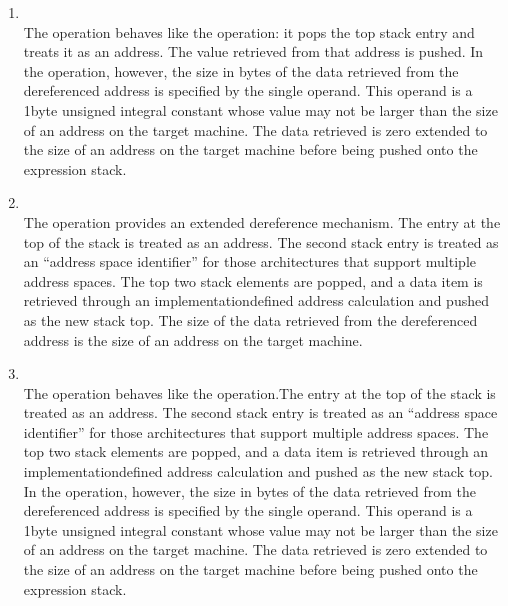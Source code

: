 \begin{enumerate}[1]
\item {} \\
The  operation behaves like the 
operation: it pops the top stack entry and treats it as an
address. The value retrieved from that address is pushed. In
the  operation, however, the size in bytes
of the data retrieved from the dereferenced address is
specified by the single operand. This operand is a 1\dash byte
unsigned integral constant whose value may not be larger
than the size of an address on the target machine. The data
retrieved is zero extended to the size of an address on the
target machine before being pushed onto the expression stack.

\item {} \\
The  operation provides an extended dereference
mechanism. The entry at the top of the stack is treated as an
address. The second stack entry is treated as an “address
space identifier” for those architectures that support
multiple address spaces. The top two stack elements are popped,
and a data item is retrieved through an implementation\dash defined
address calculation and pushed as the new stack top. The size
of the data retrieved from the dereferenced address is the
size of an address on the target machine.

\item {}\\
The  operation behaves like the
 operation.The entry at the top of the stack is
treated as an address. The second stack entry is treated as
an “address space identifier” for those architectures
that support multiple address spaces. The top two stack
elements are popped, and a data item is retrieved through an
implementation\dash defined address calculation and pushed as the
new stack top. In the  operation, however,
the size in bytes of the data retrieved from the dereferenced
address is specified by the single operand. This operand is a
1\dash byte unsigned integral constant whose value may not be larger
than the size of an address on the target machine. The data
retrieved is zero extended to the size of an address on the
target machine before being pushed onto the expression stack.


\end{enumerate}
